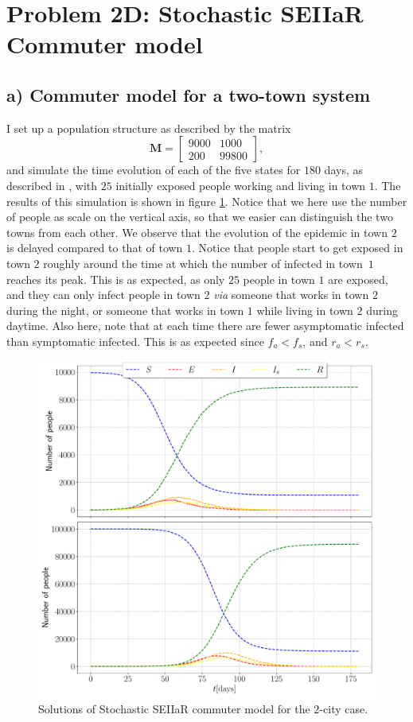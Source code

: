\section{Problem 2D: Stochastic SEIIaR Commuter model}

\subsection{a) Commuter model for a two-town system}

I set up a population structure as described by the matrix 
$$
	\mathbf{M} = \begin{bmatrix}
	9000 & 1000 \\
	200 & 99800
	\end{bmatrix},
$$
and simulate the time evolution of each of the five states for $180$ days, as described in \cite{sheet}, with $25$ initially exposed people working and living in town $1$. The results of this simulation is shown in figure \ref{fig:commuter_2city}. Notice that we here use the number of people as scale on the vertical axis, so that we easier can distinguish the two towns from each other. We observe that the evolution of the epidemic in town $2$ is delayed compared to that of town $1$. Notice that people start to get exposed in town $2$ roughly around the time at which the number of infected in town $1$ reaches its peak. This is as expected, as only $25$ people in town $1$ are exposed, and they can only infect people in town $2$ \textit{via} someone that works in town $2$ during the night, or someone that works in town $1$ while living in town $2$ during daytime. Also here, note that at each time there are fewer asymptomatic infected than symptomatic infected. This is as expected since $f_a < f_s$, and $r_a < r_s$.

\begin{figure}[htb]
	\centering
	\includegraphics[width=0.8\columnwidth]{../fig/2Da_commuter.pdf}
	\caption{Solutions of Stochastic SEIIaR commuter model for the $2$-city case.}
	\label{fig:commuter_2city}
\end{figure}


